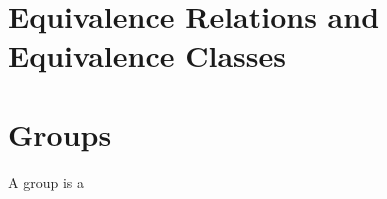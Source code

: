 \begin{appendices}
    \section{Equivalence Relations and Equivalence Classes}
\section{Groups}
A group is a 
\end{appendices}